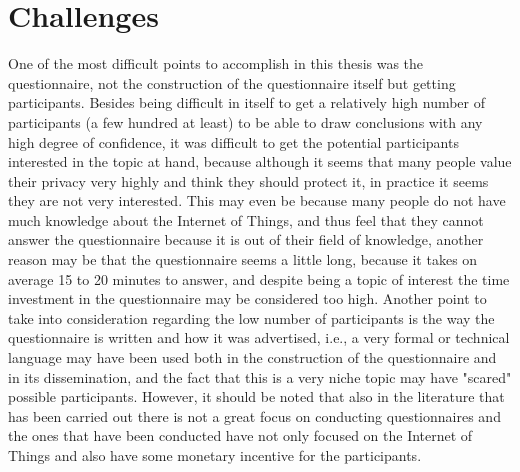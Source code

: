 %
%
\section{Challenges}

One of the most difficult points to accomplish in this thesis was the
questionnaire, not the construction of the questionnaire itself but
getting participants. Besides being difficult in itself to get a relatively
high number of participants (a few hundred at least)
to be able to draw conclusions with any high degree of confidence, it was
difficult to get the potential participants interested in the topic
at hand, because although it seems that many people value their privacy very
highly and think they should protect it, in practice it seems they
are not very interested. This may even be because many people do not have much knowledge
about the Internet of Things, and thus feel that they cannot answer the
questionnaire because it is out of their field of knowledge, another
reason may be that the questionnaire seems a little long, because it
takes on average 15 to 20 minutes to answer, and despite being a topic
of interest the time investment in the questionnaire may be considered
too high. Another point to take into consideration regarding the low
number of participants is the way the questionnaire is written and how
it was advertised, i.e., a very formal or technical language may have
been used both in the construction of the questionnaire and in its
dissemination, and the fact that this is a very niche topic may have
"scared" possible participants. However, it should be noted that also
in the literature that has been carried out there is not a great focus
on conducting questionnaires and the ones that have been conducted have
not only focused on the Internet of Things and also have some monetary
incentive for the participants.
